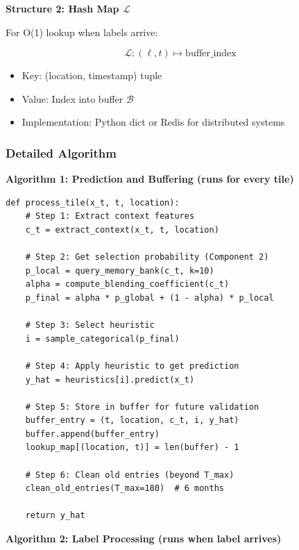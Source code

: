 \documentclass[11pt]{article}
\begin{document}
\textbf{Structure 2: Hash Map $\mathcal{L}$}

For O(1) lookup when labels arrive:

\[
\mathcal{L}: (\ell, t) \mapsto \text{buffer\_index}
\]

\begin{itemize}
    \item Key: (location, timestamp) tuple
    \item Value: Index into buffer $\mathcal{B}$
    \item Implementation: Python dict or Redis for distributed systems
\end{itemize}

\subsubsection{Detailed Algorithm}

\textbf{Algorithm 1: Prediction and Buffering (runs for every tile)}

\begin{verbatim}
def process_tile(x_t, t, location):
    # Step 1: Extract context features
    c_t = extract_context(x_t, t, location)

    # Step 2: Get selection probability (Component 2)
    p_local = query_memory_bank(c_t, k=10)
    alpha = compute_blending_coefficient(c_t)
    p_final = alpha * p_global + (1 - alpha) * p_local

    # Step 3: Select heuristic
    i = sample_categorical(p_final)

    # Step 4: Apply heuristic to get prediction
    y_hat = heuristics[i].predict(x_t)

    # Step 5: Store in buffer for future validation
    buffer_entry = (t, location, c_t, i, y_hat)
    buffer.append(buffer_entry)
    lookup_map[(location, t)] = len(buffer) - 1

    # Step 6: Clean old entries (beyond T_max)
    clean_old_entries(T_max=180)  # 6 months

    return y_hat
\end{verbatim}

\textbf{Algorithm 2: Label Processing (runs when label arrives)}
\end{document}
